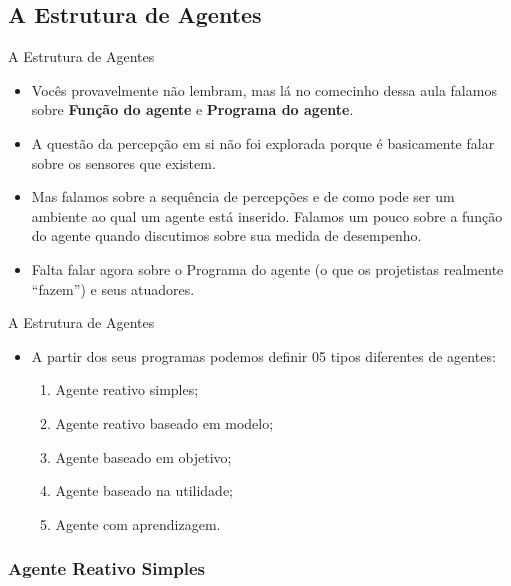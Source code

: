 \documentclass{libs/ufc_format}
\begin{document}
\subsection{A Estrutura de Agentes}

\begin{frame}{A Estrutura de Agentes}
    \begin{itemize}
        \justifying
        \item Vocês provavelmente não lembram, mas lá no comecinho dessa aula falamos sobre \textbf{Função do agente} e \textbf{Programa do agente}.
        \item A questão da percepção em si não foi explorada porque é basicamente falar sobre os sensores que existem.
        \item<2-> Mas falamos sobre a sequência de percepções e de como pode ser um ambiente ao qual um agente está inserido. Falamos um pouco sobre a função do agente quando discutimos sobre sua medida de desempenho.
        \item<3> Falta falar agora sobre o Programa do agente (o que os projetistas realmente ``fazem'') e seus atuadores.
    \end{itemize}
\end{frame}

\begin{frame}{A Estrutura de Agentes}
    \begin{itemize}
        \justifying
        \item A partir dos seus programas podemos definir 05 tipos diferentes de agentes:
            \begin{enumerate}
                \item Agente reativo simples;
                \item Agente reativo baseado em modelo;
                \item Agente baseado em objetivo;
                \item Agente baseado na utilidade;
                \item Agente com aprendizagem.
            \end{enumerate}
    \end{itemize}
\end{frame}

\subsubsection{Agente Reativo Simples}
\end{document}
